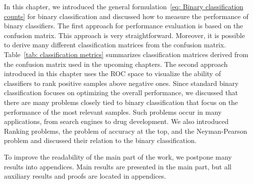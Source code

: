 In this chapter, we introduced the general formulation~\eqref{eq: Binary classification counts} for binary classification and discussed how to measure the performance of binary classifiers. The first approach for performance evaluation is based on the confusion matrix. This approach is very straightforward. Moreover, it is possible to derive many different classification matrices from the confusion matrix. Table~\ref{tab: classification metrics} summarizes classification matrices derived from the confusion matrix used in the upcoming chapters. The second approach introduced in this chapter uses the ROC space to visualize the ability of classifiers to rank positive samples above negative ones. Since standard binary classification focuses on optimizing the overall performance, we discussed that there are many problems closely tied to binary classification that focus on the performance of the most relevant samples. Such problems occur in many applications, from search engines to drug development. We also introduced Ranking problems, the problem of accuracy at the top, and the Neyman-Pearson problem and discussed their relation to the binary classification.

\begin{note}
  To improve the readability of the main part of the work, we postpone many results into appendices. Main results are presented in the main part, but all auxiliary results and proofs are located in appendices.
\end{note}

